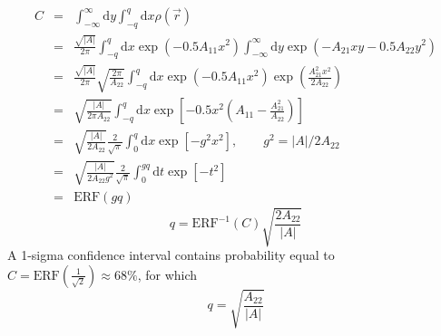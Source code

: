 \documentclass[12pt]{article}
\newcommand{\dee}{\mathrm{d}}
\newcommand{\abs}[1]{\left|#1\right|}
\begin{document}
\begin{eqnarray*}
  C 
  &=& \int_{-\infty}^{\infty}\dee y\int_{-q}^q \dee x \rho(\vec{r})\\
  &=& \frac{\sqrt{\abs{A}}}{2\pi} \int_{-q}^q \dee x \exp\left(-0.5 A_{11}x^2\right) \int_{-\infty}^{\infty}\dee y \exp\left(-A_{21}xy  -0.5A_{22}y^2 \right)\\
  &=& \frac{\sqrt{\abs{A}}}{2\pi} \sqrt{\frac{2\pi}{A_{22}}}\int_{-q}^q \dee x \exp\left(-0.5 A_{11}x^2\right) \exp\left(\frac{A_{21}^2x^2}{2A_{22}}\right)\\
  &=& \sqrt{\frac{\abs{A}}{2\pi A_{22}}}\int_{-q}^q \dee x \exp\left[-0.5 x^2\left( A_{11} - \frac{A_{21}^2}{A_{22}}\right)\right]\\
  &=& \sqrt{\frac{\abs{A}}{2 A_{22}}}\frac{2}{\sqrt{\pi}}\int_0^q \dee x \exp\left[- g^2x^2\right],\qquad g^2=\abs{A}/2A_{22} \\
  &=& \sqrt{\frac{\abs{A}}{2 A_{22}g^2}}\frac{2}{\sqrt{\pi}}\int_0^{gq} \dee t \exp\left[- t^2\right]\\
  &=& \mathrm{ERF}(gq)
\end{eqnarray*}
\begin{equation}
  q = \mathrm{ERF}^{-1}\left(C\right)\sqrt{\frac{2A_{22}}{\abs{A}}}
\end{equation}
A 1-sigma confidence interval contains probability equal to
$C=\mathrm{ERF}\left(\frac{1}{\sqrt{2}}\right)\approx 68\%$, for which
\[
q = \sqrt{\frac{A_{22}}{\abs{A}}}
\]
\end{document}
